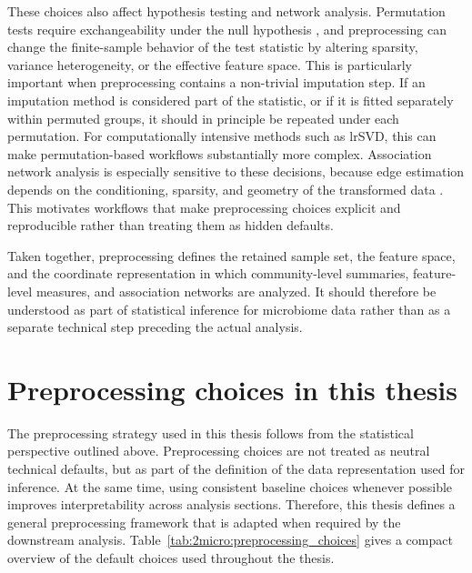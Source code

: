 These choices also affect hypothesis testing and network analysis. Permutation tests require exchangeability under the null hypothesis \citep{good2005permutation,phipson2010permutation}, and preprocessing can change the finite-sample behavior of the test statistic by altering sparsity, variance heterogeneity, or the effective feature space. This is particularly important when preprocessing contains a non-trivial imputation step. If an imputation method is considered part of the statistic, or if it is fitted separately within permuted groups, it should in principle be repeated under each permutation. For computationally intensive methods such as lrSVD, this can make permutation-based workflows substantially more complex. Association network analysis is especially sensitive to these decisions, because edge estimation depends on the conditioning, sparsity, and geometry of the transformed data \citep{kurtz2015sparse}. This motivates workflows that make preprocessing choices explicit and reproducible rather than treating them as hidden defaults.

Taken together, preprocessing defines the retained sample set, the feature space, and the coordinate representation in which community-level summaries, feature-level measures, and association networks are analyzed. It should therefore be understood as part of statistical inference for microbiome data rather than as a separate technical step preceding the actual analysis.

\section{Preprocessing choices in this thesis}
\label{sec:2micro:preprocessing_choices_thesis}

The preprocessing strategy used in this thesis follows from the statistical perspective outlined above. Preprocessing choices are not treated as neutral technical defaults, but as part of the definition of the data representation used for inference. At the same time, using consistent baseline choices whenever possible improves interpretability across analysis sections. Therefore, this thesis defines a general preprocessing framework that is adapted when required by the downstream analysis. Table~\ref{tab:2micro:preprocessing_choices} gives a compact overview of the default choices used throughout the thesis.

